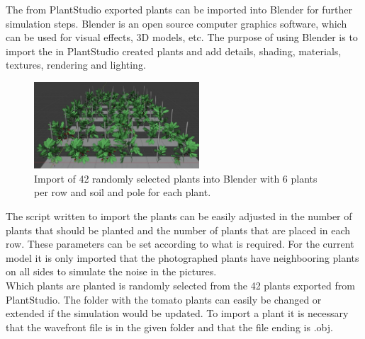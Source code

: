 The from PlantStudio exported plants can be imported into Blender for further simulation steps. Blender is an open source computer graphics software, which can be used for visual effects, 3D models, etc. The purpose of using Blender is to import the in PlantStudio created plants and  add details, shading, materials, textures, rendering and lighting. 

\begin{figure} 
	\vspace{-15pt}
	\begin{center}
		\includegraphics[width=0.55\textwidth]{BlenderImport.JPG}
		\caption{Import of 42 randomly selected plants into Blender with 6 plants per row and soil and pole for each plant.}
		\label{fig:BlenderImport}
	\end{center}
	\vspace{-20pt}
\end{figure} 

The script written to import the plants can be easily adjusted in the number of plants that should be planted and the number of plants that are placed in each row. These parameters can be set according to what is required. For the current model it is only imported that the photographed plants have neighbooring plants on all sides to simulate the noise in the pictures.\\

Which plants are planted is randomly selected from the 42 plants exported from PlantStudio. The folder with the tomato plants can easily be changed or extended if the simulation would be updated. To import a plant it is necessary that the wavefront file is in the given folder and that the file ending is .obj. 

\vspace{5pt}

\vspace{5pt}

